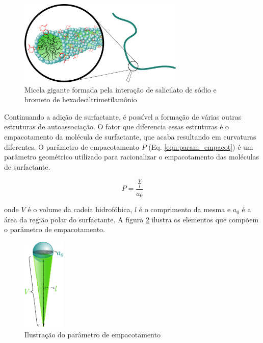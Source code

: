 	
	\begin{figure}[h]
		\centering
		\includegraphics[width=0.7\textwidth]{./imagens/introducao/micela_gigante}
		\caption{Micela gigante formada pela interação de salicilato de sódio e brometo de hexadeciltrimetilamônio}
		\label{fig:micela_gigante}
	\end{figure}
	
	Continuando a adição de surfactante, é possível a formação de várias outras estruturas de autoassociação. O fator que diferencia essas estruturas é o empacotamento da molécula de surfactante, que acaba resultando em curvaturas diferentes. O parâmetro de empacotamento \(P\) (Eq. \ref{eqn:param_empacot}) é um parâmetro geométrico utilizado para racionalizar o empacotamento das moléculas de surfactante.
	
	\begin{equation}
	P = \dfrac{\frac{V}{l}}{a_0}
	\label{eqn:param_empacot}
	\end{equation} 
	
	\noindent onde \(V\) é o volume da cadeia hidrofóbica, \(l\) é o comprimento da mesma e \(a_0\) é a área da região polar do surfactante. A figura \ref{fig:param_empacotamento} ilustra os elementos que compõem o parâmetro de empacotamento.
	
	\begin{figure}[h]
		\centering
		\includegraphics[width=2cm]{imagens/introducao/param_empacotamento}
		\caption{Ilustração do parâmetro de empacotamento}
		\label{fig:param_empacotamento}
	\end{figure}
	
